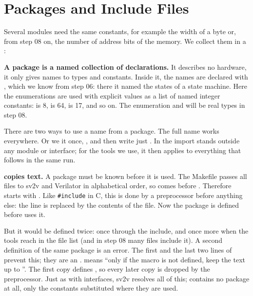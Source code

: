 \section{Packages and Include Files}
\label{sec:step07-package}

Several modules need the same constants, for example the width of a byte or,
from step 08 on, the number of address bits of the memory. We collect them in
a :


\textbf{A package is a named collection of declarations.} It describes no
hardware, it only gives names to types and constants. Inside it, the names are
declared with , which we know from step 06: there it named the
states of a state machine. Here the enumerations are used with explicit values
as a list of named integer constants:  is 8,
 is 64,  is 17, and so on. The enumeration
 and  will be real types in step 08.

There are two ways to use a name from a package. The full name
 works everywhere. Or we  it once,
, and then write just
. In  the import stands outside any module or
interface; for the tools we use, it then applies to everything that follows in
the same run.

\textbf{ copies text.} A package must be known before it is used.
The Makefile passes all  files to sv2v and Verilator in alphabetical
order, so  comes before . Therefore 
starts with . Like \texttt{\#include} in C, this is done
by a preprocessor before anything else: the line is replaced by the contents of
the file. Now the package is defined before  uses it.

But it would be defined twice: once through the include, and once more when
the tools reach  in the file list (and in step 08 many files
include it). A second definition of the same package is an error. The first
and the last two lines of  prevent this; they are an
.  means ``only if the macro
 is not defined, keep the text up to ''. The first copy
defines , so every later copy is dropped by the preprocessor. Just
as with interfaces, sv2v resolves all of this;  contains no package
at all, only the constants substituted where they are used.

